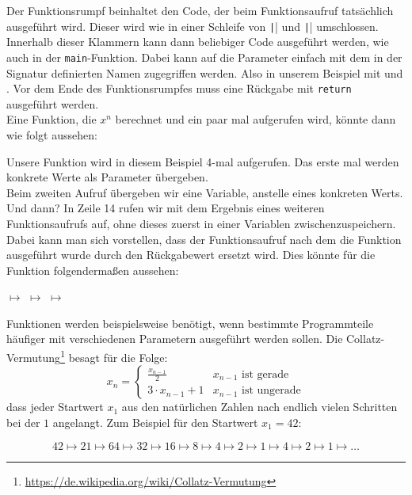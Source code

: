 Der Funktionsrumpf beinhaltet den Code, der beim Funktionsaufruf tatsächlich ausgeführt wird.
Dieser wird wie in einer Schleife von \texttt|{| und \texttt|}| umschlossen.
Innerhalb dieser Klammern kann dann beliebiger Code ausgeführt werden, wie auch in der \texttt{main}-Funktion.
Dabei kann auf die Parameter einfach mit dem in der Signatur definierten Namen zugegriffen werden.
Also in unserem Beispiel mit  und .
Vor dem Ende des Funktionsrumpfes muss eine Rückgabe mit \texttt{return} ausgeführt werden.\\
\newpage
Eine Funktion, die $ x^n $ berechnet und ein paar mal aufgerufen wird, könnte dann wie folgt aussehen:


Unsere Funktion wird in diesem Beispiel 4-mal aufgerufen.
Das erste mal werden konkrete Werte als Parameter übergeben.\\
Beim zweiten Aufruf übergeben wir eine Variable, anstelle eines konkreten Werts.\\
Und dann? In Zeile 14 rufen wir  mit dem Ergebnis eines weiteren Funktionsaufrufs auf, ohne dieses zuerst in einer Variablen zwischenzuspeichern.
Dabei kann man sich vorstellen, dass der Funktionsaufruf nach dem die Funktion ausgeführt wurde durch den Rückgabewert ersetzt wird.
Dies könnte für die Funktion  folgendermaßen aussehen:

\begin{center}
	 $\mapsto$  $\mapsto$  $\mapsto$ 
\end{center}




Funktionen werden beispielsweise benötigt, wenn bestimmte Programmteile häufiger mit verschiedenen Parametern ausgeführt werden sollen.
Die Collatz-Vermutung\footnote{\url{https://de.wikipedia.org/wiki/Collatz-Vermutung}} besagt für die Folge:
\[
	x_n =
	\begin{cases}
		\frac{x_{n-1}}{2} & x_{n-1} \text{ ist gerade} \\
		3 \cdot x_{n-1} + 1 & x_{n-1} \text{ ist ungerade}
	\end{cases}
\]
dass jeder Startwert $x_1$ aus den natürlichen Zahlen nach endlich vielen Schritten bei der $1$ angelangt.
Zum Beispiel für den Startwert $x_1 = 42$:

\[
    42 \mapsto 21 \mapsto 64 \mapsto 32 \mapsto 16 \mapsto 8 \mapsto 4 \mapsto 2 \mapsto 1 \mapsto 4 \mapsto 2 \mapsto 1 \mapsto \ldots
\]

